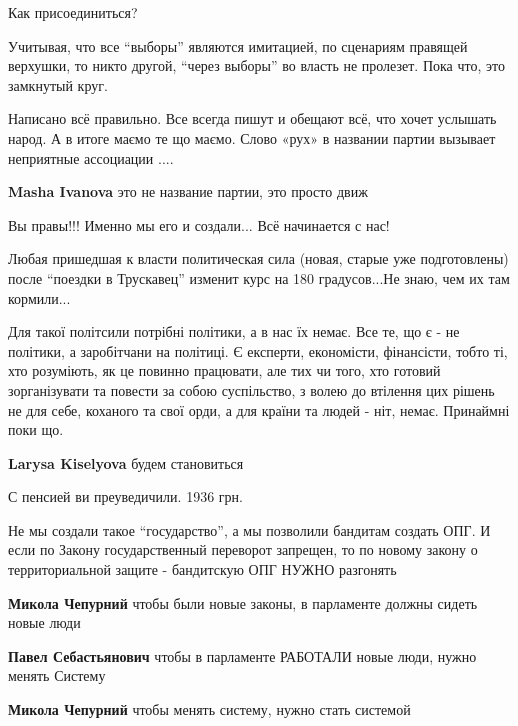 \begin{itemize}
Как присоединиться?


Учитывая, что все \enquote{выборы} являются имитацией, по сценариям правящей верхушки,
то никто другой, \enquote{через выборы} во власть не пролезет. Пока что, это замкнутый
круг.


Написано всё правильно. Все всегда пишут и обещают всё, что хочет услышать
народ. А в итоге маємо те що маємо.  Слово «рух» в названии партии вызывает
неприятные ассоциации ....

\textbf{Masha Ivanova} это не название партии, это просто движ

Вы правы!!! Именно мы его и создали...
Всё начинается с нас!


Любая пришедшая к власти политическая сила (новая, старые уже подготовлены) после
\enquote{поездки в Трускавец} изменит курс на 180 градусов...Не знаю, чем их там
кормили...


Для такої політсили потрібні політики, а в нас їх немає. Все те, що є - не
політики, а заробітчани на політиці. Є експерти, економісти, фінансісти, тобто
ті, хто розуміють, як це повинно працювати, але тих чи того, хто готовий
зорганізувати та повести за собою суспільство, з волею до втілення цих рішень
не для себе, коханого та свої орди, а для країни та людей - ніт, немає.
Принаймні поки що.

\textbf{Larysa Kiselyova} будем становиться

С пенсией ви преуведичили. 1936 грн.


Не мы создали такое \enquote{государство}, а мы позволили бандитам создать ОПГ. И если
по Закону государственный переворот запрещен, то по новому закону о
территориальной защите - бандитскую ОПГ НУЖНО разгонять

\begin{itemize} %
\textbf{Микола Чепурний} чтобы были новые законы, в парламенте должны сидеть новые люди

\textbf{Павел Себастьянович} чтобы в парламенте РАБОТАЛИ новые люди, нужно менять Систему

\textbf{Микола Чепурний} чтобы менять систему, нужно стать системой


\end{itemize}
\end{itemize}
